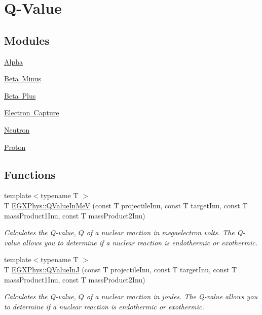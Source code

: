\hypertarget{group___e_g_x_phys-_q_value}{}\section{Q-\/\+Value}
\label{group___e_g_x_phys-_q_value}
\subsection*{Modules}
\begin{DoxyCompactItemize}
\item 
\mbox{\hyperlink{group___e_g_x_phys-_q_value-_alpha}{Alpha}}
\item 
\mbox{\hyperlink{group___e_g_x_phys-_q_value-_beta_minus}{Beta Minus}}
\item 
\mbox{\hyperlink{group___e_g_x_phys-_q_value-_beta_plus}{Beta Plus}}
\item 
\mbox{\hyperlink{group___e_g_x_phys-_q_value-_electron_capture}{Electron Capture}}
\item 
\mbox{\hyperlink{group___e_g_x_phys-_q_value-_neutron}{Neutron}}
\item 
\mbox{\hyperlink{group___e_g_x_phys-_q_value-_proton}{Proton}}
\end{DoxyCompactItemize}
\subsection*{Functions}
\begin{DoxyCompactItemize}
\item 
{\footnotesize template$<$typename T $>$ }\\T \mbox{\hyperlink{group___e_g_x_phys-_q_value_ga53f07ac44d3d3b217b8c5b7aa548e3fc}{E\+G\+X\+Phys\+::\+Q\+Value\+In\+MeV}} (const T projectile\+Inu, const T target\+Inu, const T mass\+Product1\+Inu, const T mass\+Product2\+Inu)
\begin{DoxyCompactList}\small\item\em Calculates the Q-\/value, $Q$ of a nuclear reaction in megaelectron volts. The Q-\/value allows you to determine if a nuclear reaction is endothermic or exothermic. \end{DoxyCompactList}\item 
{\footnotesize template$<$typename T $>$ }\\T \mbox{\hyperlink{group___e_g_x_phys-_q_value_gaa61414574096631a36ff857b311c435c}{E\+G\+X\+Phys\+::\+Q\+Value\+InJ}} (const T projectile\+Inu, const T target\+Inu, const T mass\+Product1\+Inu, const T mass\+Product2\+Inu)
\begin{DoxyCompactList}\small\item\em Calculates the Q-\/value, $Q$ of a nuclear reaction in joules. The Q-\/value allows you to determine if a nuclear reaction is endothermic or exothermic. \end{DoxyCompactList}\end{DoxyCompactItemize}


